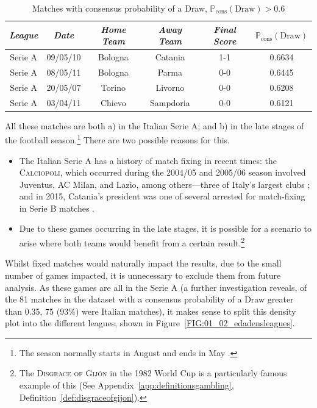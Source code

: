\documentclass[a4paper,10pt]{report}
\begin{document}
\begin{table}[h!]\begin{center}\begin{tabular}[h!]{c|c||c|c|c||c}
	\textit{League} & \textit{Date} & \textit{Home Team} & \textit{Away Team} & \textit{Final Score} & $\mathbb{P}_{\textrm{cons}}(\textrm{Draw})$ \\ \hline \hline
	Serie A & 09/05/10 & Bologna	& Catania 	& 1-1 & 0.6634 \\
	Serie A & 08/05/11 & Bologna 	& Parma 	& 0-0 & 0.6445 \\
	Serie A & 20/05/07 & Torino	 	& Livorno 	& 0-0 & 0.6208 \\ 
	Serie A & 03/04/11 & Chievo 	& Sampdoria & 0-0 & 0.6121
\end{tabular}\end{center}\caption{Matches with consensus probability of a Draw,  $\mathbb{P}_{\textrm{cons}}(\textrm{Draw})>0.6$}\label{tab:highprobdraws}\end{table}

All these matches are both a) in the Italian Serie A; and b) in the late stages of the football season.\footnote{The season normally starts in August and ends in May \autocite{PremierLeagueHandbook}.} There are two possible reasons for this.
\begin{itemize}
	\item The Italian Serie A has a history of match fixing in recent times: the \textsc{Calciopoli}, which occurred during the 2004/05 and 2005/06 season involved Juventus, AC Milan, and Lazio, among others---three of Italy's largest clubs \autocite{Calciopoli}; and in 2015, Catania's president was one of several arrested for match-fixing in Serie B matches \autocite{catania}.
	\item Due to these games occurring in the late stages, it is possible for a scenario to arise where both teams would benefit from a certain result.\footnote{The \textsc{Disgrace of Gijón} in the 1982 World Cup is a particularly famous example of this (See Appendix~\ref{app:definitionsgambling}, Definition~\ref{def:disgraceofgijon}).}
\end{itemize}

Whilst fixed matches would naturally impact the results, due to the small number of games impacted, it is unnecessary to exclude them from future analysis. As these games are all in the Serie A (a further investigation reveals, of the 81 matches in the dataset with a consensus probability of a Draw greater than 0.35, 75 (93\%) were Italian matches), it makes sense to split this density plot into the different leagues, shown in Figure~\ref{FIG:01_02_edadensleagues}.
\end{document}
